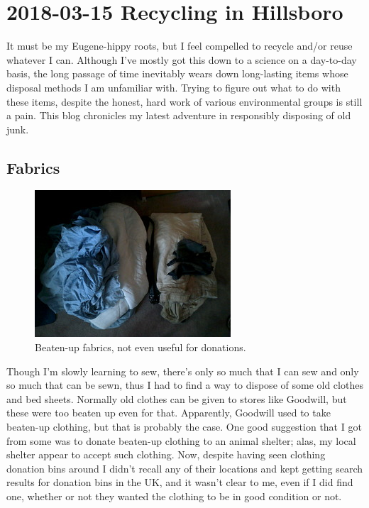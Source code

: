 \documentclass{article}
\begin{document}
\section{2018-03-15 Recycling in Hillsboro}
It must be my Eugene-hippy roots, but I feel compelled to recycle and/or reuse whatever I can.  Although I've mostly got this down to a science on a day-to-day basis, the long passage of time inevitably wears down long-lasting items whose disposal methods I am unfamiliar with.  Trying to figure out what to do with these items, despite the honest, hard work of various environmental groups is still a pain.  This blog chronicles my latest adventure in responsibly disposing of old junk.

\subsection{Fabrics}
\begin{figure}
\includegraphics{files/blog/2018_03_15_recycling_in_hillsboro/2018_03_15_clothing.png}
\caption{Beaten-up fabrics, not even useful for donations.}
\end{figure}
Though I'm slowly learning to sew, there's only so much that I can sew and only so much that can be sewn, thus I had to find a way to dispose of some old clothes and bed sheets.  Normally old clothes can be given to stores like Goodwill, but these were too beaten up even for that.  Apparently, Goodwill used to take beaten-up clothing, but that is probably  the case.  One good suggestion that I got from some  was to donate beaten-up clothing to an animal shelter; alas, my local shelter  appear to accept such clothing.  Now, despite having seen clothing donation bins around I didn't recall any of their locations and kept getting search results for donation bins in the UK, and it wasn't clear to me, even if I did find one, whether or not they wanted the clothing to be in good condition or not.
\end{document}
